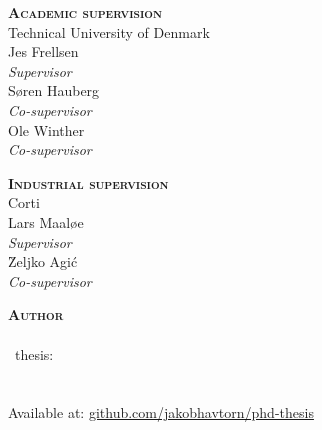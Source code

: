 

\thispagestyle{empty} %

\hfill\vfill

\noindent
\small%
\textsc{\textbf{Academic supervision}}\\
Technical University of Denmark
\medskip
\\Jes Frellsen\\
\textit{Supervisor}%
\medskip
\\Søren Hauberg\\
\textit{Co-supervisor}%
\medskip
\\Ole Winther\\
\textit{Co-supervisor}%
\medskip

\bigskip
\noindent
\textsc{\textbf{Industrial supervision}}\\
Corti%
\medskip
\\Lars Maaløe\\
\textit{Supervisor}%
\medskip
\\\u{Z}eljko Agi\'c\\
\textit{Co-supervisor}%
\medskip


\bigskip
\noindent
\textsc{\textbf{Author}}
\medskip
\\\thesisauthor\\
\thesistypeabbr\ thesis:\\
\textit{\thesistitle}\\
\textcopyright\ \thesismonth\ \thesisyear\\
Available at: \href{https://github.com/JakobHavtorn/phd-thesis}{github.com/jakobhavtorn/phd-thesis}

\normalsize
\normalfont
